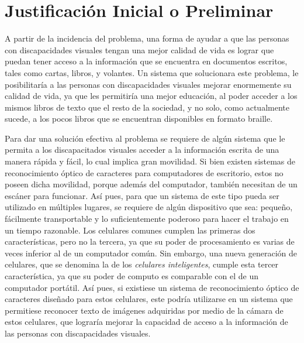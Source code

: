 \documentclass[a4paper, 11pt, oneside]{article}
\begin{document}
	\section{Justificación Inicial o Preliminar}
	A partir de la incidencia del problema, una forma de ayudar a que las personas con discapacidades visuales tengan una mejor calidad de vida es lograr que puedan tener acceso a la información que se encuentra en documentos escritos, tales como cartas, libros, y volantes. Un sistema que solucionara este problema, le posibilitaría a las personas con discapacidades visuales mejorar enormemente su calidad de vida, ya que les permitiría una mejor educación, al poder acceder a los mismos libros de texto que el resto de la sociedad, y no solo, como actualmente sucede, a los pocos libros que se encuentran disponibles en formato braille.

	Para dar una solución efectiva al problema se requiere de algún sistema que le permita a los discapacitados visuales acceder a la información escrita de una manera rápida y fácil, lo cual implica gran movilidad. Si bien existen sistemas de reconocimiento óptico de caracteres para computadores de escritorio, estos no poseen dicha movilidad, porque además del computador, también necesitan de un escáner para funcionar. Así pues, para que un sistema de este tipo pueda ser utilizado en múltiples lugares, se requiere de algún dispositivo que sea: pequeño, fácilmente transportable y lo suficientemente poderoso para hacer el trabajo en un tiempo razonable. Los celulares comunes cumplen las primeras dos características, pero no la tercera, ya que su poder de procesamiento es varias de veces inferior al de un computador común. Sin embargo, una nueva generación de celulares, que se denomina la de los \textit{celulares inteligentes}, cumple esta tercer característica, ya que su poder de computo es comparable con el de un computador portátil. Así pues, si existiese un sistema de reconocimiento óptico de caracteres diseñado para estos celulares, este podría utilizarse en un sistema que permitiese reconocer texto de imágenes adquiridas por medio de la cámara de estos celulares, que lograría mejorar la capacidad de acceso a la información de las personas con discapacidades visuales.
\end{document}
